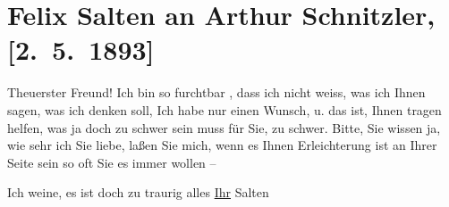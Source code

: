 

\renewcommand{\erwaehntePersonen}{Personen: Johann Schnitzler}
\renewcommand{\erwaehnteOrte}{Orte: Wien}
\renewcommand{\erwaehnteWerke}{}
\section[Felix Salten an Arthur Schnitzler, {[}2. 5. 1893{]}]{Felix Salten an Arthur Schnitzler, {[}2. 5. 1893{]}}
\nopagebreak{}
\rehead{ }\normalsize\beginnumbering{}
\toendnotes[C]{\smallbreak\pagebreak[2]}
\toendnotes[C]{\smallbreak}
\pstart
           \noindent{}{\pb}Theuerster Freund! Ich bin so furchtbar \label{K_L03122-1v}\label{K_L03122-1h},
               dass ich nicht weiss, was ich Ihnen sagen, was ich denken soll, Ich habe nur einen
               Wunsch, u. das ist, Ihnen tragen helfen, was ja doch {\pb}zu schwer sein muss für Sie, zu
               schwer. Bitte, Sie wissen ja, wie sehr ich Sie liebe, laßen Sie mich, wenn es Ihnen
               Erleichterung ist an Ihrer Seite sein so oft Sie es immer wollen – \pend
           
\pstart
           Ich weine, es ist doch zu traurig alles\pend
           \pstart \uline{Ihr}{ }\spacefill\mbox{Salten}\pend{}\endnumbering{}  
      